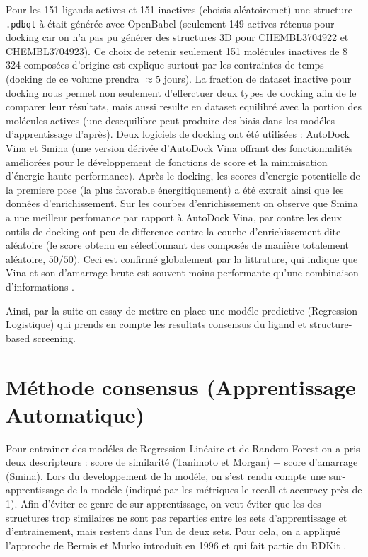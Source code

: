 \documentclass{isddmaster}
\begin{document}
	Pour les 151 ligands actives et 151 inactives (choisis aléatoiremet) une structure \lstinline{.pdbqt} à était générée avec OpenBabel (seulement 149 actives rétenus pour docking car on n'a pas pu générer des structures 3D pour CHEMBL3704922 et CHEMBL3704923). Ce choix de retenir seulement 151 molécules inactives de 8 324 composées d'origine est explique surtout par les contraintes de temps (docking de ce volume prendra $\approx 5$ jours). La fraction de dataset inactive pour docking nous permet non seulement d'efferctuer deux types de docking afin de le comparer leur résultats, mais aussi resulte en dataset equilibré avec la portion des molécules actives (une desequilibre peut produire des biais dans les modéles d'apprentissage d'après).  
	Deux logiciels de docking ont été utilisées : AutoDock Vina et Smina (une version dérivée d'AutoDock Vina offrant des fonctionnalités améliorées pour le développement de fonctions de score et la minimisation d'énergie haute performance).
	Après le docking, les scores d'energie potentielle de la premiere pose (la plus favorable énergitiquement) a été extrait ainsi que les données d'enrichissement.
	Sur les courbes d'enrichissement on observe que Smina a une meilleur perfomance par rapport à AutoDock Vina, par contre les deux outils de docking ont peu de difference contre la courbe d'enrichissement dite aléatoire (le score obtenu en sélectionnant des composés de manière totalement aléatoire, $50/50$).
	Ceci est confirmé globalement par la littrature, qui indique que Vina et son d'amarrage brute est souvent moins performante qu'une combinaison d'informations \cite{Confidence}.

	Ainsi, par la suite on essay de mettre en place une modéle predictive (Regression Logistique) qui prends en compte les resultats consensus du ligand et structure-based screening. 
	
	\section{Méthode consensus (Apprentissage Automatique)}

	Pour entrainer des modéles de Regression Linéaire et de Random Forest on a pris deux descripteurs :  score de similarité (Tanimoto et Morgan) + score d'amarrage (Smina). Lors du developpement de la modéle, on s'est rendu compte une sur-apprentissage de la modéle (indiqué par les métriques le recall et accuracy près de 1).
	Afin d'éviter ce genre de sur-apprentissage, on veut éviter que les des structures trop similaires ne sont pas reparties entre les sets d'apprentissage et d'entrainement, mais restent dans l'un de deux sets.
	Pour cela, on a appliqué l'approche de Bermis et Murko introduit en 1996 et qui fait partie du RDKit \cite{bemisPropertiesKnownDrugs1996,huLessonsLearnedMolecular2011}. 
\end{document}
